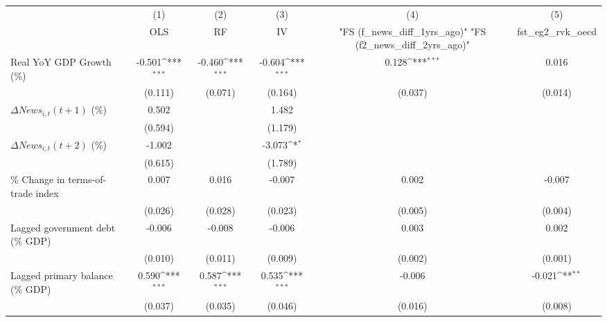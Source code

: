 {
\def\sym#1{\ifmmode^{#1}\else\(^{#1}\)\fi}
\begin{tabular}{l*{5}{c}}
\toprule
                    &\multicolumn{1}{c}{(1)}&\multicolumn{1}{c}{(2)}&\multicolumn{1}{c}{(3)}&\multicolumn{1}{c}{(4)}&\multicolumn{1}{c}{(5)}\\
                    &\multicolumn{1}{c}{OLS}&\multicolumn{1}{c}{RF}&\multicolumn{1}{c}{IV}&\multicolumn{1}{c}{ "FS (f_news_diff_1yrs_ago)"  "FS (f2_news_diff_2yrs_ago)" }&\multicolumn{1}{c}{fst_eg2_rvk_oecd}\\
\midrule
Real YoY GDP Growth (\%)&      -0.501\sym{***}&      -0.460\sym{***}&      -0.604\sym{***}&       0.128\sym{***}&       0.016         \\
                    &     (0.111)         &     (0.071)         &     (0.164)         &     (0.037)         &     (0.014)         \\
\addlinespace
$ \Delta News_{i,t}(t+1)$ (\%)&       0.502         &                     &       1.482         &                     &                     \\
                    &     (0.594)         &                     &     (1.179)         &                     &                     \\
\addlinespace
$ \Delta News_{i,t}(t+2)$ (\%)&      -1.002         &                     &      -3.073\sym{*}  &                     &                     \\
                    &     (0.615)         &                     &     (1.789)         &                     &                     \\
\addlinespace
\% Change in terms-of-trade index&       0.007         &       0.016         &      -0.007         &       0.002         &      -0.007         \\
                    &     (0.026)         &     (0.028)         &     (0.023)         &     (0.005)         &     (0.004)         \\
\addlinespace
Lagged government debt (\% GDP)&      -0.006         &      -0.008         &      -0.006         &       0.003         &       0.002         \\
                    &     (0.010)         &     (0.011)         &     (0.009)         &     (0.002)         &     (0.001)         \\
\addlinespace
Lagged primary balance (\% GDP)&       0.590\sym{***}&       0.587\sym{***}&       0.535\sym{***}&      -0.006         &      -0.021\sym{**} \\
                    &     (0.037)         &     (0.035)         &     (0.046)         &     (0.016)         &     (0.008)         \\

\end{tabular}}
